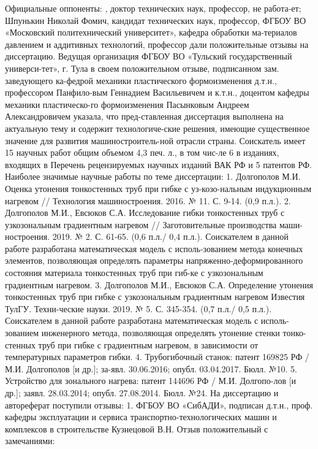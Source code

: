 Официальные оппоненты:
\opponentOneFio, доктор технических наук, профессор, не работа-ет;
Шпунькин Николай Фомич, кандидат технических наук, профессор, ФГБОУ ВО «Московский политехнический университет», кафедра обработки ма-териалов давлением и аддитивных технологий, профессор
дали положительные отзывы на диссертацию.
Ведущая организация ФГБОУ ВО «Тульский государственный универси-тет», г. Тула в своем положительном отзыве, подписанном зам. заведующего ка-федрой механики пластического формоизменения д.т.н., профессором Панфило-вым Геннадием Васильевичем и к.т.н., доцентом кафедры механики пластическо-го формоизменения Пасынковым Андреем Александровичем указала, что пред-ставленная диссертация выполнена на актуальную тему и содержит технологиче-ские решения, имеющие существенное значение для развития машиностроитель-ной отрасли страны.
Соискатель имеет 15 научных работ общим объемом 4,3 печ. л., в том чис-ле 6 в изданиях, входящих в Перечень рецензируемых научных изданий ВАК РФ 
и 5 патентов РФ.
Наиболее значимые научные работы по теме диссертации:
1. Долгополов М.И. Оценка утонения тонкостенных труб при гибке с уз-козо-нальным индукционным нагревом // Технология машиностроения. 2016. № 11. 
С. 9-14. (0,9 п.л.).
2. Долгополов М.И., Евсюков С.А. Исследование гибки тонкостенных труб с узкозональным градиентным нагревом // Заготовительные производства маши-ностроения. 2019. № 2. С. 61-65. (0,6 п.л./ 0,4 п.л.).
Соискателем в данной работе разработана математическая модель с исполь-зованием метода конечных элементов, позволяющая определять параметры напряженно-деформированного состояния материала тонкостенных труб при гиб-ке с узкозональным градиентным нагревом.
3. Долгополов М.И., Евсюков С.А. Определение утонения тонкостенных труб при гибке с узкозональным градиентным нагревом Известия ТулГУ. Техни-ческие науки. 2019. № 5. С. 345-354. (0,7 п.л./ 0,5 п.л.).
Соискателем в данной работе разработана математическая модель с исполь-зованием инженерного метода, позволяющая определять утонение стенки тонко-стенных труб при гибке с градиентным нагревом, в зависимости от температурных параметров гибки.
4. Трубогибочный станок: патент 169825 РФ / М.И. Долгополов [и др.]; за-явл. 30.06.2016; опубл. 03.04.2017. Бюлл. №10.
5. Устройство для зонального нагрева: патент 144696 РФ / М.И. Долгопо-лов [и др.]; заявл. 28.03.2014; опубл. 27.08.2014. Бюлл. №24.
На диссертацию и автореферат поступили отзывы: 
1. ФГБОУ ВО «СибАДИ», подписан д.т.н., проф. кафедры эксплуатации и сервиса транспортно-технологических машин и комплексов в строительстве Кузнецовой В.Н. Отзыв положительный с замечаниями:
